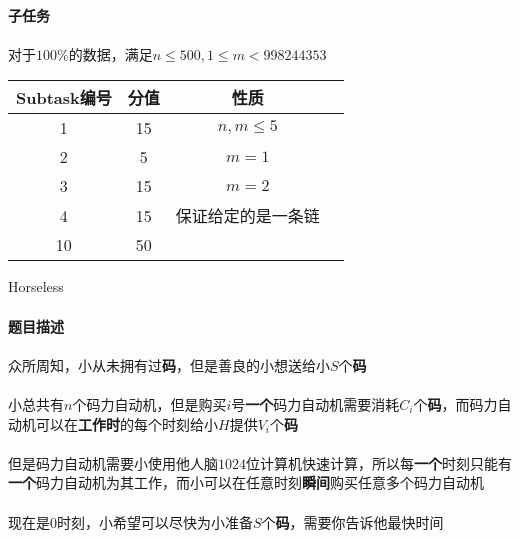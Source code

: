 \documentclass[UTF8]{ctexart}
\begin{document}
\paragraph{子任务}
\paragraph{}对于$100\%$的数据，满足$n\le 500,1\leq m<998244353$
\begin{center}
	\begin{tabular}{|c|c|c|c|}
		\hline
		Subtask编号&分值&性质\\
		\hline
		1&15&$n,m\le5$\\
		\hline
		2&5&$m=1$\\
		\hline
		3&15&$m=2$\\
		\hline
		4&15&保证给定的是一条链\\
		\hline
		10&50&\\
		\hline
	\end{tabular}	
\end{center}

\clearpage
\begin{center}
	\large{Horseless}
\end{center}
\paragraph{题目描述}
\paragraph{}众所周知，小从未拥有过\textbf{码}，但是善良的小想送给小$S$个\textbf{码}
\paragraph{}小总共有$n$个码力自动机，但是购买$i$号\textbf{一个}码力自动机需要消耗$C_i$个\textbf{码}，而码力自动机可以在\textbf{工作时}的每个时刻给小$H$提供$V_i$个\textbf{码}
\paragraph{}但是码力自动机需要小使用他人脑$1024$位计算机快速计算，所以每\textbf{一个}时刻只能有\textbf{一个}码力自动机为其工作，而小可以在任意时刻\textbf{瞬间}购买任意多个码力自动机
\paragraph{}现在是$0$时刻，小希望可以尽快为小准备$S$个\textbf{码}，需要你告诉他最快时间
\end{document}
